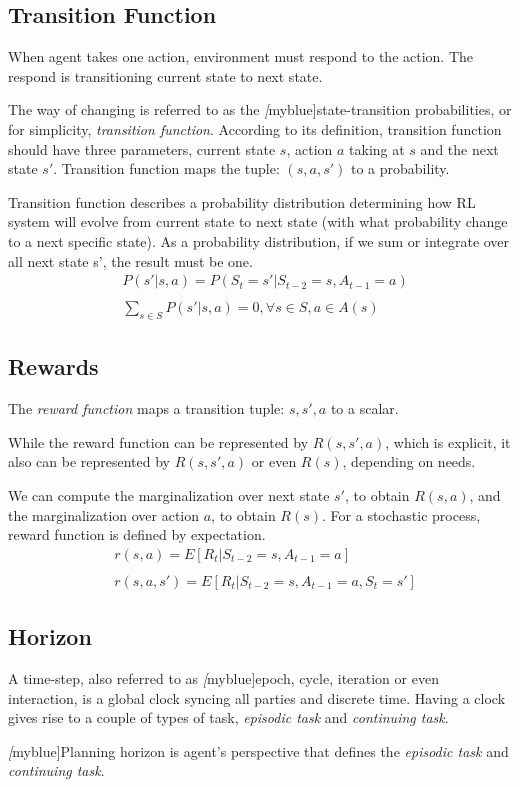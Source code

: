     \subsection{Transition Function}
    When agent takes one action, environment must respond to the action. The respond is transitioning current state to next state. \par
    The way of changing is referred to as the \emph[myblue]{state-transition probabilities}, or for simplicity, \emph{transition function}. According to its definition, transition function should have three parameters, current state $s$, action $a$ taking at $s$ and the next state $s'$. Transition function maps the tuple: $(s, a, s')$ to a probability. \par
    Transition function describes a probability distribution determining how RL system will evolve from current state to next state (with what probability change to a next specific state). As a probability distribution, if we sum or integrate over all next state s', the result must be one.
    \begin{align*}
    & P(s'|s,a) = P(S_{t}=s'|S_{t-2}=s, A_{t-1}=a) \\
    \\
    & \sum\limits_{s\in S} P(s'|s,a) = 0, \forall s\in S, a\in A(s)
    \end{align*}

    \subsection{Rewards}
    The \emph{reward function} maps a transition tuple: $s, s', a$ to a scalar.\par 
    While the reward function can be represented by $R(s, s', a)$, which is explicit, it also can be represented by $R(s, s', a)$ or even $R(s)$, depending on needs. \par
    We can compute the marginalization over next state $s'$, to obtain $R(s, a)$, and the marginalization over action $a$, to obtain $R(s)$.
    For a stochastic process, reward function is defined by expectation.
    \begin{align*}
    & r(s,a)=E[R_t|S_{t-2}=s, A_{t-1}=a] \\
    \\
    & r(s,a,s')=E[R_t|S_{t-2}=s, A_{t-1}=a, S_t=s'] 
    \end{align*}

    \subsection{Horizon}
    A time-step, also referred to as \emph[myblue]{epoch, cycle, iteration or even interaction,} is a global clock syncing all parties and discrete time. Having a clock gives rise to a couple of types of task, {\itshape episodic task} and {\itshape continuing task}. \par
    \emph[myblue]{Planning horizon} is agent's perspective that defines the {\itshape episodic task} and {\itshape continuing task}.

